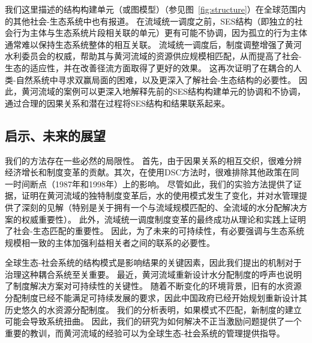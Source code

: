 我们这里描述的结构构建单元（或图模型）（参见图~\ref{fig:structure}）在全球范围内的其他社会-生态系统中也有报道。
在流域统一调度之前，SES结构（即独立的社会行为主体与生态系统片段相关联的单元）更有可能不协调，因为孤立的行为主体通常难以保持生态系统整体的相互关联\cite{sayles2017,sayles2019,cai2016,bergsten2019}。
流域统一调度后，制度调整增强了黄河水利委员会的权威，帮助其与黄河流域的资源供应规模相匹配，从而提高了社会-生态的适应性，并在改善径流方面取得了更好的效果\cite{cumming2020a,wang2019d}。
这再次证明了在耦合的人类-自然系统中寻求双赢局面的困难\cite{hegwood2022}，以及更深入了解社会-生态结构的必要性\cite{bergsten2019, sayles2019}。
因此，黄河流域的案例可以更深入地解释先前的SES结构构建单元的协调和不协调，通过合理的因果关系和潜在过程将SES结构和结果联系起来。

\subsection{启示、未来的展望}

我们的方法存在一些必然的局限性。
首先，由于因果关系的相互交织，很难分辨经济增长和制度变革的贡献。其次，在使用DSC方法时，很难排除其他政策在同一时间断点（1987年和1998年）上的影响。
尽管如此，我们的实验方法提供了证据，证明在黄河流域的独特制度变革后，水的使用模式发生了变化，并对水管理提供了深刻的见解（特别是关于拥有一个与流域规模匹配的、全流域的水分配解决方案的权威重要性）\cite{bodin2017b, ostrom2009, reyers2018}。
此外，流域统一调度制度变革的最终成功从理论和实践上证明了社会-生态匹配的重要性。
因此，为了未来的可持续性，有必要强调与生态系统规模相一致的主体加强利益相关者之间的联系的必要性。

全球生态-社会系统的结构模式是影响结果的关键因素，因此我们提出的机制对于治理这种耦合系统至关重要。
最近，黄河流域重新设计水分配制度的呼声也说明了制度解决方案对可持续性的关键性。
随着不断变化的环境背景，旧有的水资源分配制度已经不能满足可持续发展的要求，因此中国政府已经开始规划重新设计其历史悠久的水资源分配制度\cite{wang2019a}。
我们的分析表明，如果模式不匹配，新制度的建立可能会导致系统扭曲。
因此，我们的研究为如何解决不正当激励问题提供了一个重要的教训，而黄河流域的经验可以为全球生态-社会系统的管理提供指导\cite{hegwood2022, muneepeerakul2017, leslie2015}。
